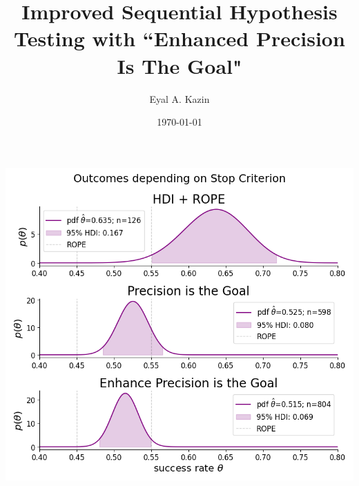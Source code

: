 \documentclass{article}
\title{Improved Sequential Hypothesis Testing with
``Enhanced Precision Is The Goal"}
\date{\today}
\author{Eyal A. Kazin}
\begin{document}
\maketitle



\includegraphics[scale=0.5]{cherry_posteriors.png}

\end{document}
